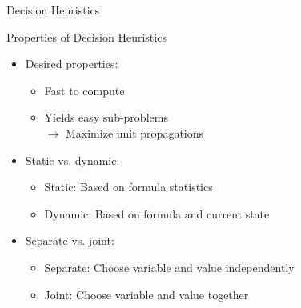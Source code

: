 \documentclass[t]{sdqbeamer2}
\begin{document}
\begin{frame}{Decision Heuristics}
\begin{block}{Properties of Decision Heuristics}
	\begin{itemize}\setlength{\itemsep}{1em}
		\item Desired properties:
		\begin{itemize}\setlength{\itemsep}{1ex}
			\item Fast to compute
			\item Yields easy sub-problems\\
			$\rightarrow$ Maximize unit propagations
		\end{itemize}
		\item Static vs. dynamic:
		\begin{itemize}\setlength{\itemsep}{1ex}
			\item Static: Based on formula statistics
			\item Dynamic: Based on formula and current state
		\end{itemize}
		\item Separate vs. joint:
		\begin{itemize}\setlength{\itemsep}{1ex}
			\item Separate: Choose variable and value independently
			\item Joint: Choose variable and value together
		\end{itemize}
	\end{itemize}
\end{block}
\end{frame}
\end{document}
